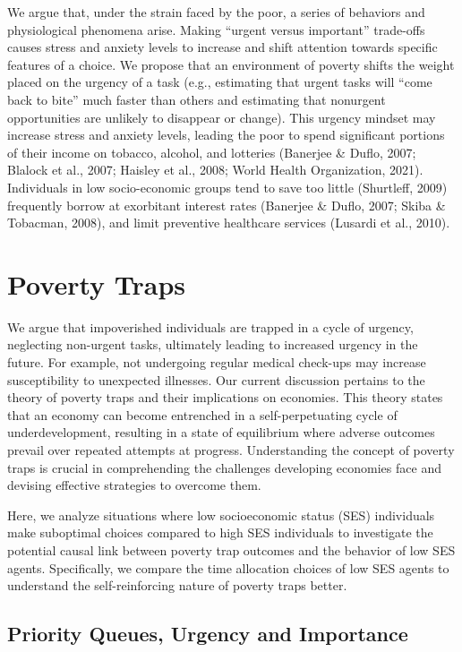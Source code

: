 \documentclass[
]{report}
\begin{document}
We argue that, under the strain faced by the poor, a series of behaviors
and physiological phenomena arise. Making ``urgent versus important''
trade-offs causes stress and anxiety levels to increase and shift
attention towards specific features of a choice. We propose that an
environment of poverty shifts the weight placed on the urgency of a task
(e.g., estimating that urgent tasks will ``come back to bite'' much
faster than others and estimating that nonurgent opportunities are
unlikely to disappear or change). This urgency mindset may increase
stress and anxiety levels, leading the poor to spend significant
portions of their income on tobacco, alcohol, and lotteries (Banerjee \&
Duflo, 2007; Blalock et al., 2007; Haisley et al., 2008; World Health
Organization, 2021). Individuals in low socio-economic groups tend to
save too little (Shurtleff, 2009) frequently borrow at exorbitant
interest rates (Banerjee \& Duflo, 2007; Skiba \& Tobacman, 2008), and
limit preventive healthcare services (Lusardi et al., 2010).

\hypertarget{poverty-traps}{%
\section{Poverty Traps}\label{poverty-traps}}

We argue that impoverished individuals are trapped in a cycle of
urgency, neglecting non-urgent tasks, ultimately leading to increased
urgency in the future. For example, not undergoing regular medical
check-ups may increase susceptibility to unexpected illnesses. Our
current discussion pertains to the theory of poverty traps and their
implications on economies. This theory states that an economy can become
entrenched in a self-perpetuating cycle of underdevelopment, resulting
in a state of equilibrium where adverse outcomes prevail over repeated
attempts at progress. Understanding the concept of poverty traps is
crucial in comprehending the challenges developing economies face and
devising effective strategies to overcome them.

Here, we analyze situations where low socioeconomic status (SES)
individuals make suboptimal choices compared to high SES individuals to
investigate the potential causal link between poverty trap outcomes and
the behavior of low SES agents. Specifically, we compare the time
allocation choices of low SES agents to understand the self-reinforcing
nature of poverty traps better.

\hypertarget{priority-queues-urgency-and-importance}{%
\subsection{Priority Queues, Urgency and
Importance}\label{priority-queues-urgency-and-importance}}
\end{document}
